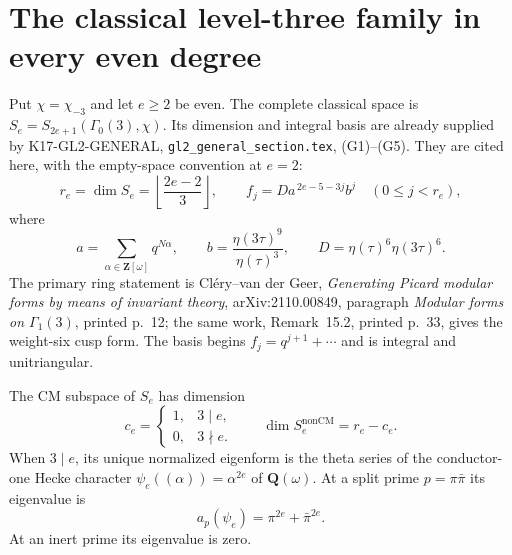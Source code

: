\section{The classical level-three family in every even degree}
\label{sec:gl2-uniform}

Put $\chi=\chi_{-3}$ and let $e\geq2$ be even. The complete
classical space is $S_e=S_{2e+1}(\Gamma_0(3),\chi)$.
Its dimension and integral basis are already supplied by
K17-GL2-GENERAL, \texttt{gl2\_general\_section.tex}, (G1)--(G5).
They are cited here, with the empty-space convention at $e=2$:
\[
 r_e=\dim S_e=\left\lfloor\frac{2e-2}{3}\right\rfloor,\qquad
 f_j=D a^{\,2e-5-3j}b^j\quad(0\leq j<r_e),
 \tag{GL.1}
\]
where
\[
 a=\sum_{\alpha\in\mathbf Z[\omega]}q^{N\alpha},\qquad
 b=\frac{\eta(3\tau)^9}{\eta(\tau)^3},\qquad
 D=\eta(\tau)^6\eta(3\tau)^6 .
\]
The primary ring statement is Cl\'ery--van der Geer,
\emph{Generating Picard modular forms by means of invariant theory},
arXiv:2110.00849, paragraph \emph{Modular forms on $\Gamma_1(3)$},
printed p.~12; the same work, Remark~15.2, printed p.~33,
gives the weight-six cusp form. The basis begins
$f_j=q^{j+1}+\cdots$ and is integral and unitriangular.

\begin{proposition}[KT-GL2-CM]
The CM subspace of $S_e$ has dimension
\[
 c_e=\begin{cases}1,&3\mid e,\\0,&3\nmid e.\end{cases}
 \qquad
 \dim S_e^{\mathrm{nonCM}}=r_e-c_e.
 \tag{GL.2}
\]
When $3\mid e$, its unique normalized eigenform is the theta series
of the conductor-one Hecke character
$\psi_e((\alpha))=\alpha^{2e}$ of $\mathbf Q(\omega)$.
At a split prime $p=\pi\bar\pi$ its eigenvalue is
\[
             a_p(\psi_e)=\pi^{2e}+\bar\pi^{2e}.
 \tag{GL.3}
\]
At an inert prime its eigenvalue is zero.
\end{proposition}

